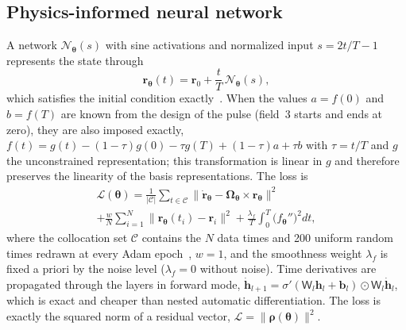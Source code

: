 \documentclass[aps,pra,twocolumn,superscriptaddress,10pt,longbibliography,floatfix]{revtex4-2}
\newcommand{\rvec}{\bm r}
\begin{document}
\subsection{Physics-informed neural network}\label{sec:pinn}
A network $\mathcal N_{\bm\theta}(s)$ with sine activations and normalized input $s=2t/T-1$ represents
the state through
\begin{equation}
  \rvec_{\bm\theta}(t) = \rvec_0 + \frac{t}{T}\,\mathcal N_{\bm\theta}(s),
  \label{eq:hardic}
\end{equation}
which satisfies the initial condition exactly~\cite{lagaris1998,lu2021hard,norambuena2024pinnqc}. When
the values $a=f(0)$ and $b=f(T)$ are known from the design of the pulse (field~3 starts and ends at
zero), they are also imposed exactly,
$f(t)=g(t)-(1-\tau)g(0)-\tau g(T)+(1-\tau)a+\tau b$ with $\tau=t/T$ and $g$ the unconstrained
representation; this transformation is linear in $g$ and therefore preserves the linearity of the basis
representations. The loss is
\begin{multline}
  \mathcal L(\bm\theta) = \frac{1}{|\mathcal C|}\sum_{t\in\mathcal C}
    \big\|\dot{\rvec}_{\bm\theta}-\bm\Omega_{\bm\theta}\times\rvec_{\bm\theta}\big\|^2 \\
  + \frac{w}{N}\sum_{i=1}^{N}\big\|\rvec_{\bm\theta}(t_i)-\rvec_i\big\|^2
  + \frac{\lambda_f}{T}\int_0^T \big(f_{\bm\theta}''\big)^2 dt ,
  \label{eq:loss}
\end{multline}
where the collocation set $\mathcal C$ contains the $N$ data times and 200 uniform random times redrawn
at every Adam epoch~\cite{wu2023sampling,norambuena2024pinnqc}, $w=1$, and the smoothness weight
$\lambda_f$ is fixed a priori by the noise level ($\lambda_f=0$ without noise). Time derivatives are
propagated through the layers in forward mode, $\dot{\bm h}_{l+1}=\sigma'(\mathsf W_l\bm h_l+\bm b_l)
\odot\mathsf W_l\dot{\bm h}_l$, which is exact and cheaper than nested automatic differentiation. The
loss is exactly the squared norm of a residual vector, $\mathcal L=\|\bm\rho(\bm\theta)\|^2$.
\end{document}
